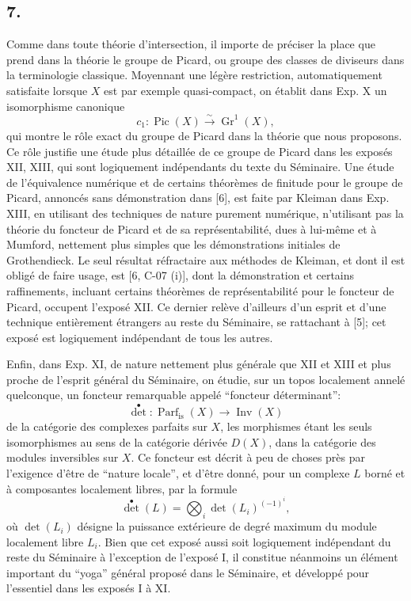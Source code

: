 \documentclass[11pt]{article}
\newcommand{\Gr}{\operatorname{Gr}}
\newcommand{\Parf}{\operatorname{Parf}}
\newcommand{\Inv}{\operatorname{Inv}}
\newcommand{\Pic}{\operatorname{Pic}}
\begin{document}
\subsection*{7.}
Comme dans toute th\'eorie d'intersection, il importe de pr\'eciser la place que prend dans la th\'eorie le groupe de Picard, ou groupe des classes de diviseurs dans la terminologie classique. Moyennant une l\'eg\`ere restriction, automatiquement satisfaite lorsque $X$ est par exemple quasi-compact, on \'etablit dans Exp. X un isomorphisme canonique
\begin{equation}\tag{7.1}
c_1:\Pic(X)\xrightarrow{\sim}\Gr^1(X),
\end{equation}
qui montre le r\^ole exact du groupe de Picard dans la th\'eorie que nous proposons. Ce r\^ole justifie une \'etude plus d\'etaill\'ee de ce groupe de Picard dans les expos\'es XII, XIII, qui sont logiquement ind\'ependants du texte du S\'eminaire. Une \'etude de l'\'equivalence num\'erique et de certains th\'eor\`emes de finitude pour le groupe de Picard, annonc\'es sans d\'emonstration dans [6], est faite par Kleiman dans Exp. XIII, en utilisant des techniques de nature purement num\'erique, n'utilisant pas la th\'eorie du foncteur de Picard et de sa repr\'esentabilit\'e, dues \`a lui-m\^eme et \`a Mumford, nettement plus simples que les d\'emonstrations initiales de Grothendieck. Le seul r\'esultat r\'efractaire aux m\'ethodes de Kleiman, et dont il est oblig\'e de faire usage, est [6, C-07 (i)], dont la d\'emonstration et certains raffinements, incluant certains th\'eor\`emes de repr\'esentabilit\'e pour le foncteur de Picard, occupent l'expos\'e XII. Ce dernier rel\`eve d'ailleurs d'un esprit et d'une technique enti\`erement \'etrangers au reste du S\'eminaire, se rattachant \`a [5]; cet expos\'e est logiquement ind\'ependant de tous les autres.

Enfin, dans Exp. XI, de nature nettement plus g\'en\'erale que XII et XIII et plus proche de l'esprit g\'en\'eral du S\'eminaire, on \'etudie, sur un topos localement annel\'e quelconque, un foncteur remarquable appel\'e ``foncteur d\'eterminant'':
\begin{equation}\tag{7.2}
\det^\bullet:\Parf_{\mathrm{is}}(X)\longrightarrow \Inv(X)
\end{equation}
de la cat\'egorie des complexes parfaits sur $X$, les morphismes \'etant les seuls isomorphismes au sens de la cat\'egorie d\'eriv\'ee $D(X)$, dans la cat\'egorie des modules inversibles sur $X$. Ce foncteur est d\'ecrit \`a peu de choses pr\`es par l'exigence d'\^etre de ``nature locale'', et d'\^etre donn\'e, pour un complexe $L$ born\'e et \`a composantes localement libres, par la formule
\begin{equation}\tag{7.3}
\det^\bullet(L)=\bigotimes_i \det(L_i)^{(-1)^i},
\end{equation}
o\`u $\det(L_i)$ d\'esigne la puissance ext\'erieure de degr\'e maximum du module localement libre $L_i$. Bien que cet expos\'e aussi soit logiquement ind\'ependant du reste du S\'eminaire \`a l'exception de l'expos\'e I, il constitue n\'eanmoins un \'el\'ement important du ``yoga'' g\'en\'eral propos\'e dans le S\'eminaire, et d\'evelopp\'e pour l'essentiel dans les expos\'es I \`a XI.
\end{document}
